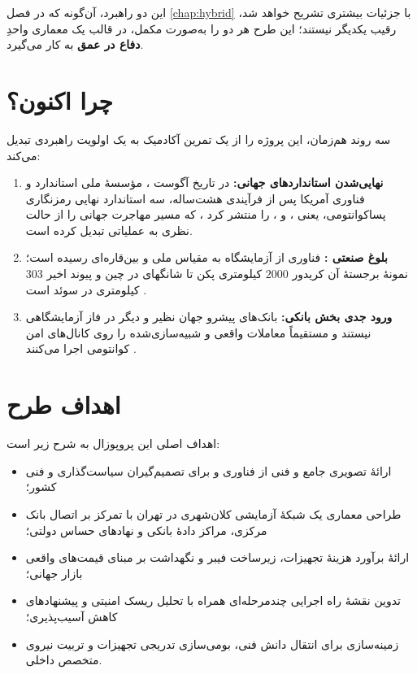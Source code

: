 این دو راهبرد، آن‌گونه که در فصل \ref{chap:hybrid} با جزئیات بیشتری تشریح خواهد شد، رقیب یکدیگر نیستند؛ این طرح هر دو را به‌صورت مکمل، در قالب یک معماری واحدِ \textbf{دفاع در عمق}  به کار می‌گیرد.

\section{چرا اکنون؟}

سه روند هم‌زمان، این پروژه را از یک تمرین آکادمیک به یک اولویت راهبردی تبدیل می‌کند:

\begin{enumerate}
\item \textbf{نهایی‌شدن استانداردهای جهانی:} در تاریخ  آگوست ، مؤسسهٔ ملی استاندارد و فناوری آمریکا  پس از فرآیندی هشت‌ساله، سه استاندارد نهایی رمزنگاری پساکوانتومی، یعنی ،  و ، را منتشر کرد \Cite{nist2024release}، که مسیر مهاجرت جهانی را از حالت نظری به عملیاتی تبدیل کرده است.
\item \textbf{بلوغ صنعتی :} فناوری  از آزمایشگاه به مقیاس ملی و بین‌قاره‌ای رسیده است؛ نمونهٔ برجستهٔ آن کریدور $2000$ کیلومتری پکن تا شانگهای در چین \Cite{mdpi2023qkdn} و پیوند اخیر $303$ کیلومتری در سوئد است \Cite{arxiv2606sweden}.
\item \textbf{ورود جدی بخش بانکی:} بانک‌های پیشرو جهان نظیر  و  دیگر در فاز آزمایشگاهی نیستند و مستقیماً معاملات واقعی و شبیه‌سازی‌شده را روی کانال‌های امن کوانتومی اجرا می‌کنند \Cite{techinformed2025banks}.
\end{enumerate}

\section{اهداف طرح}

اهداف اصلی این پروپوزال به شرح زیر است:

\begin{itemize}
\item ارائهٔ تصویری جامع و فنی از فناوری  و  برای تصمیم‌گیران سیاست‌گذاری و فنی کشور؛
\item طراحی معماری یک شبکهٔ آزمایشی  کلان‌شهری در تهران با تمرکز بر اتصال بانک مرکزی، مراکز دادهٔ بانکی و نهادهای حساس دولتی؛
\item ارائهٔ برآورد هزینهٔ تجهیزات، زیرساخت فیبر و نگهداشت بر مبنای قیمت‌های واقعی بازار جهانی؛
\item تدوین نقشهٔ راه اجرایی چندمرحله‌ای همراه با تحلیل ریسک امنیتی و پیشنهادهای کاهش آسیب‌پذیری؛
\item زمینه‌سازی برای انتقال دانش فنی، بومی‌سازی تدریجی تجهیزات و تربیت نیروی متخصص داخلی.
\end{itemize}

